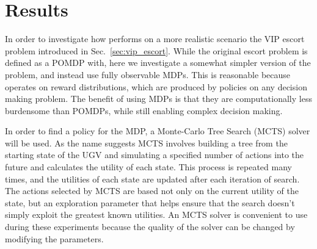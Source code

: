 \section{Results} \label{sec:results}
In order to investigate how \xQ{} performs on a more realistic scenario the VIP escort problem introduced in Sec.~\ref{sec:vip_escort}. While the original escort problem is defined as a POMDP with, here we investigate a somewhat simpler version of the problem, and instead use fully observable MDPs. This is reasonable because \xQ{} operates on reward distributions, which are produced by policies on any decision making problem. The benefit of using MDPs is that they are computationally less burdensome than POMDPs, while still enabling complex decision making.

In order to find a policy for the MDP, a Monte-Carlo Tree Search (MCTS) solver will be used. As the name suggests MCTS involves building a tree from the starting state of the UGV and simulating a specified number of actions into the future and calculates the utility of each state. This process is repeated many times, and the utilities of each state are updated after each iteration of search. The actions selected by MCTS are based not only on the current utility of the state, but an exploration parameter that helps ensure that the search doesn't simply exploit the greatest known utilities. An MCTS solver is convenient to use during these experiments because the quality of the solver can be changed by modifying the parameters.

